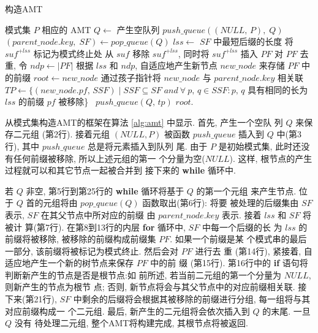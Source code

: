 \begin{algorithm}
  \caption{构造AMT}\scriptsize
  \label{alg:amt}
  \begin{algorithmic}[1]
    \REQUIRE 模式集 $P$
    \ENSURE  相应的 AMT
    \STATE
    \STATE $Q \leftarrow$ 产生空队列
    \STATE $push\_queue((NULL,\,P),\; Q)$
    \STATE
    \STATE $(parent\_node.key,\; SF) \leftarrow pop\_queue(Q)$
    \STATE $lss \leftarrow$ $SF$ 中最短后缀的长度
    \STATE 将 $suf^{+lss}$ 标记为模式终止处
    \ENDIF
    \STATE   从 $suf$ 移除 $suf^{+lss}$, 同时将 $suf^{+lss}$ 插入 $PF$
    \ENDFOR
    \STATE 对 $PF$ 去重, 令 $ndp \leftarrow |PF|$
    \STATE 根据 $lss$ 和 $ndp$, 自适应地产生新节点
    $new\_node$ 来存储 $PF$ 中的前缀
    \STATE $root \leftarrow new\_node$
    \ELSE
    \STATE 通过孩子指针将 $new\_node$
    与 $parent\_node.key$ 相关联
    \ENDIF
    \STATE $TP \leftarrow \{(new\_node.pf,\, SSF) \mid SSF \subseteq SF\; and
    \ \forall \ p,\,q \in SSF: p,\,q$ 具有相同的长为 $lss$ 的前缀
    $pf$ 被移除\}\
    \STATE $push\_queue(Q,\,tp)$
    \ENDFOR
    \ENDWHILE
    \STATE
    \RETURN $root$.
  \end{algorithmic}
\end{algorithm}

从模式集构造AMT的框架在算法 \ref{alg:amt} 中显示. 首先, 产生一个空队
列 $Q$ 来保存二元组 (第2行). 接着元组 $(NULL, P)$ 被函数 $push\_queue$
插入到 $Q$ 中(第3行), 其中 $push\_queue$ 总是将元素插入到队列
尾. 由于 $P$ 是初始模式集, 此时还没有任何前缀被移除, 所以上述元组的第一
个分量为空($NULL$). 这样, 根节点的产生过程就可以和其它节点一起被合并到
接下来的 \textbf{while} 循环中.

若 $Q$ 非空, 第5行到第25行的 \textbf{while} 循环将基于 $Q$ 的第一个元组
来产生节点. 位于 $Q$ 首的元组将由 $pop\_queue(Q)$ 函数取出(第6行): 将要
被处理的后缀集由 $SF$ 表示, $SF$ 在其父节点中所对应的前缀
由 $parent\_node.key$ 表示. 接着 $lss$ 和 $SF$ 将被计
算(第7行). 在第8到13行的内层 \textbf{for} 循环中, $SF$ 中每一个后缀的长
为 $lss$ 的前缀将被移除, 被移除的前缀构成前缀集 $PF$. 如果一个前缀是某
个模式串的最后一部分, 该前缀将被标记为模式终止. 然后会对 $PF$ 进行去
重 (第14行), 紧接着, 自适应地产生一个新的树节点来保存 $PF$ 中的前
缀 (第15行). 第16行中的 \textbf{if} 语句将判断新产生的节点是否是根节点:如
前所述, 若当前二元组的第一个分量为 $NULL$, 则新产生的节点为根节
点; 否则, 新节点将会与其父节点中的对应前缀相关联. 接下来(第21行), $SF$
中剩余的后缀将会根据其被移除的前缀进行分组, 每一组将与其对应前缀构成一
个二元组. 最后, 新产生的二元组将会依次插入到 $Q$ 的末尾. 一旦 $Q$ 没有
待处理二元组, 整个AMT将构建完成, 其根节点将被返回.


